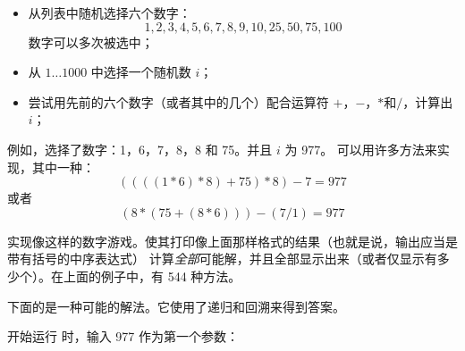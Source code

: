 \begin{Exercise}[title={数字游戏},difficulty=2]
\label{ex:numbercruncher}
\begin{itemize}
\item{从列表中随机选择六个数字：
$$1, 2, 3, 4, 5, 6, 7, 8, 9, 10, 25, 50, 75, 100$$
数字可以多次被选中；}
\item{从 $1 \ldots 1000$ 中选择一个随机数 $i$；}
\item{尝试用先前的六个数字（或者其中的几个）配合运算符 $+$，$-$，$*$和$/$，计算出 $i$；}
\end{itemize}
例如，选择了数字：1，6，7，8，8 和 75。并且 $i$ 为 977。
可以用许多方法来实现，其中一种：
$$ ((((1 * 6) * 8) + 75) * 8) - 7 = 977$$ 
或者
$$ (8*(75+(8*6)))-(7/1) = 977$$

\Question\label{ex:cruncher q1}
实现像这样的数字游戏。使其打印像上面那样格式的结果（也就是说，输出应当是带有括号的中序表达式）
\Question\label{ex:cruncher q2}
计算\emph{全部}可能解，并且全部显示出来（或者仅显示有多少个）。在上面的例子中，有 544 种方法。
\end{Exercise}

\begin{Answer}
\Question 
下面的是一种可能的解法。它使用了递归和回溯来得到答案。


\Question
开始运行  时，输入 977 作为第一个参数：
\vspace{1em}

\end{Answer}
